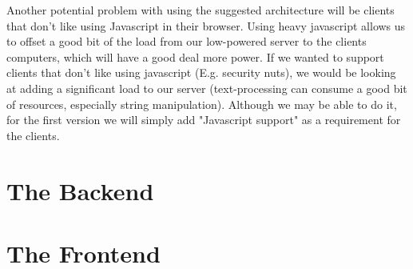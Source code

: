 Another potential problem with using the suggested architecture will be clients that don't like using Javascript in their browser.
Using heavy javascript allows us to offset a good bit of the load from our low-powered server to the clients computers, which will have a good deal more power.
If we wanted to support clients that don't like using javascript (E.g. security nuts), we would be looking at adding a significant load to our server (text-processing can consume a good bit of resources, especially string manipulation).
Although we may be able to do it, for the first version we will simply add "Javascript support" as a requirement for the clients.

\section{The Backend}








\section{The Frontend}









